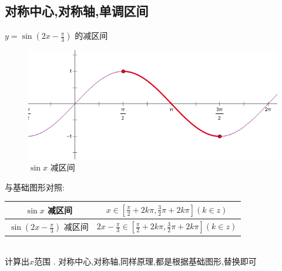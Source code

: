 \documentclass[hyperref, UTF8,11pt,a4paper]{ctexart} %
\begin{document}
\subsection {对称中心,对称轴,单调区间}

{\color{red}  $y=\sin \left(2 x-\frac{\pi}{3}\right)$ 的减区间} \\
\begin{figure}[h] %
	\begin{center}
		\includegraphics[scale=0.3]  {pic/sanjiaohanshu/dandiaojianqujian.png}
		\caption{$\sin x$ 减区间}
	\end{center}
\end{figure}


与基础图形对照:
\begin{tabular}{|c|c|}
	\hline
	$\sin x$ 减区间                              & $x \in\left[\frac{\pi}{2}+2 k \pi, \frac{3}{2} \pi+2 k \pi\right](k \in z)$                 \\
	\hline
	$\sin \left(2 x-\frac{\pi}{3}\right)$ 减区间 & $2 x-\frac{\pi}{3} \in\left[\frac{\pi}{2}+2 k \pi, \frac{3}{2} \pi+2 k \pi\right](k \in z)$ \\
	\hline
\end{tabular} \\
计算出$x$范围 . {\color{red}  对称中心,对称轴,同样原理,都是根据基础图形,替换即可}

\end{document}
